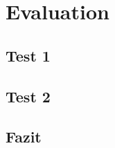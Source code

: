 \section{Evaluation}\label{sec:Evaluation}
\subsection{Test 1}
\subsection{Test 2}
\subsection{Fazit}